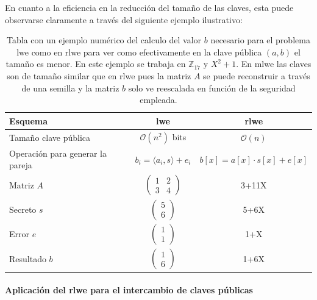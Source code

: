 En cuanto a la eficiencia en la reducción del tamaño de las claves, esta puede observarse claramente a través del siguiente ejemplo ilustrativo:
\begin{table}[H]
	\centering
	\renewcommand{\arraystretch}{1.2}
	\begin{tabular}{lcc}
		\hline
		Esquema & \acrshort{lwe} & \acrshort{rlwe} \\
		\hline
		Tamaño clave pública & \(\mathcal{O}(n^2)\) bits & \(\mathcal{O}(n)\)  \\
		\hline
		Operación para generar la pareja & \(b_i=\langle a_i, s \rangle + e_i\) & \(b[x]=a[x]\cdot s[x]+e[x]\)\\
		\hline
		Matriz \(A\) &$\begin{pmatrix}
							1  &2\\
							3 &4
						\end{pmatrix}$ &3+11X\\
		\hline
		Secreto \(s\) & $\begin{pmatrix}
							5\\
							6
						\end{pmatrix}$&5+6X\\
		\hline
		Error \(e\)& $\begin{pmatrix}
							1\\
							1
						\end{pmatrix}$&1+X\\
		\hline
		Resultado \(b\)&$\begin{pmatrix}
							1\\
							6
						\end{pmatrix}$ & 1+6X\\
		\hline
	\end{tabular}
	\caption{Tabla con un ejemplo numérico del calculo del valor \(b\) necesario para el problema \acrshort{lwe} como en \acrshort{rlwe} para ver como efectivamente en la clave pública \((a,b)\) el tamaño es menor. En este ejemplo se trabaja en \(\mathbb{Z}_{17}\) y \(X^2 + 1\). En \acrshort{mlwe} las claves son de tamaño similar que en \acrshort{rlwe} pues la matriz \(A\) se puede reconstruir a través de una semilla y la matriz \(b\) solo ve reescalada en función de la seguridad empleada.}
	\label{tab:LWE-RLWE}
\end{table}


\newpage

\paragraph{Aplicación del \acrshort{rlwe} para el intercambio de claves públicas}
\mbox{}\\

